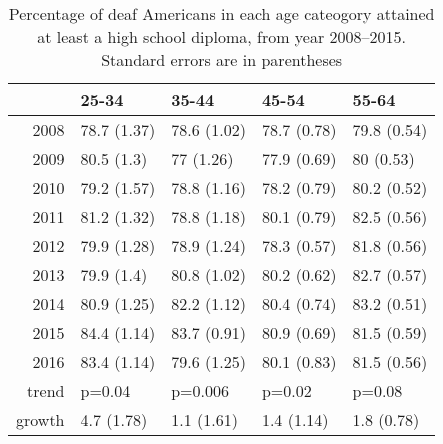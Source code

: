 \documentclass{article}\usepackage[]{graphicx}\usepackage[]{color}
\begin{document}
\begin{table}[ht]
\centering
\begin{tabular}{rllll}
  \hline
 & 25-34 & 35-44 & 45-54 & 55-64 \\
  \hline
2008 & 78.7 (1.37) & 78.6 (1.02) & 78.7 (0.78) & 79.8 (0.54) \\
  2009 & 80.5 (1.3) & 77 (1.26) & 77.9 (0.69) & 80 (0.53) \\
  2010 & 79.2 (1.57) & 78.8 (1.16) & 78.2 (0.79) & 80.2 (0.52) \\
  2011 & 81.2 (1.32) & 78.8 (1.18) & 80.1 (0.79) & 82.5 (0.56) \\
  2012 & 79.9 (1.28) & 78.9 (1.24) & 78.3 (0.57) & 81.8 (0.56) \\
  2013 & 79.9 (1.4) & 80.8 (1.02) & 80.2 (0.62) & 82.7 (0.57) \\
  2014 & 80.9 (1.25) & 82.2 (1.12) & 80.4 (0.74) & 83.2 (0.51) \\
  2015 & 84.4 (1.14) & 83.7 (0.91) & 80.9 (0.69) & 81.5 (0.59) \\
  2016 & 83.4 (1.14) & 79.6 (1.25) & 80.1 (0.83) & 81.5 (0.56) \\
  trend & p=0.04 & p=0.006 & p=0.02 & p=0.08 \\
  growth & 4.7 (1.78) & 1.1 (1.61) & 1.4 (1.14) & 1.8 (0.78) \\
   \hline
\end{tabular}
\caption{Percentage of deaf Americans in each age cateogory attained at least a high school diploma, from year 2008--2015. Standard errors are in parentheses}
\label{tab:deafAgeTime}
\end{table}
\end{document}
